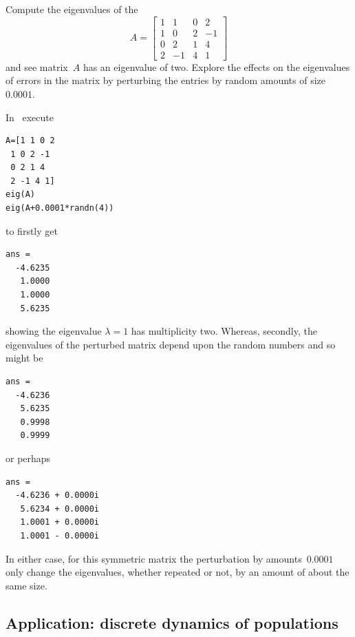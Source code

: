 \begin{example} \label{eg:}
Compute the eigenvalues of the 
\begin{equation*}
A=\begin{bmatrix}1&1&0&2
\\1&0&2&-1
\\0&2&1&4
\\2&-1&4&1\end{bmatrix}
\end{equation*}
and see matrix~\(A\) has an eigenvalue of  two.  
Explore the effects on the eigenvalues of errors in the matrix by perturbing the entries by random amounts of size~\(0.0001\).
\begin{solution} 
In \script\ execute
\begin{verbatim}
A=[1 1 0 2
 1 0 2 -1
 0 2 1 4
 2 -1 4 1]
eig(A)
eig(A+0.0001*randn(4))
\end{verbatim}
\setbox\ajrqrbox\hbox{}%
\marginpar{\usebox{\ajrqrbox}}%
to firstly get
\begin{verbatim}
ans =
  -4.6235
   1.0000
   1.0000
   5.6235
\end{verbatim}
showing the eigenvalue \(\lambda=1\) has multiplicity two.
Whereas, secondly, the eigenvalues of the perturbed matrix depend upon the random numbers and so might be
\begin{verbatim}
ans =
  -4.6236
   5.6235
   0.9998
   0.9999
\end{verbatim}
or perhaps
\begin{verbatim}
ans =
  -4.6236 + 0.0000i
   5.6234 + 0.0000i
   1.0001 + 0.0000i
   1.0001 - 0.0000i
\end{verbatim}
In either case, for this symmetric matrix the perturbation by amounts~\(0.0001\) only change the eigenvalues, whether repeated or not, by an amount of about the same size.
\end{solution}
\end{example}











\subsection{Application: discrete dynamics of populations}
\label{sec:ddp}

